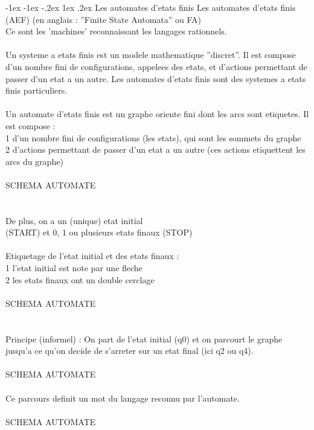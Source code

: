 \documentclass[5pt]{article}
\makeatletter
\renewcommand{\subsubsection}{\@startsection {section}{1}{\z@}%
             {-1ex \@plus -1ex \@minus -.2ex}%
             {1ex \@plus.2ex}%
             {\normalfont\scriptsize\sffamily\bfseries}}
\makeatother
\begin{document}
\begin{scriptsize}
\subsubsection{Les automates d’etats finis}
Les automates d’etats finis (AEF) (en anglais : ”Finite State Automata” ou FA)\\
Ce sont les ’machines’ reconnaissant les langages rationnels.\\
\\
Un systeme a etats finis est un modele mathematique ”discret”. Il est compose d’un nombre fini de configurations, appelees des etats, et d’actions permettant de passer d’un etat a un autre. Les automates d’etats finis sont des systemes a etats finis particuliers.\\
\\
Un automate d’etats finis est un graphe oriente fini dont les arcs sont etiquetes. Il est compose :\\
1 d’un nombre fini de configurations (les etats), qui sont les sommets du graphe\\
2 d’actions permettant de passer d’un etat a un autre (ces actions etiquettent les arcs du graphe)\\
\\
SCHEMA AUTOMATE\\
\\
\\
De plus, on a un (unique) etat initial\\
(START) et 0, 1 ou plusieurs etats finaux (STOP)\\
\\
Etiquetage de l’etat initial et des etats finaux :\\
1 l’etat initial est note par une fleche\\
2 les etats finaux ont un double cerclage\\
\\
SCHEMA AUTOMATE\\
\\
\\
Principe (informel) : On part de l’etat initial (q0) et on parcourt le graphe jusqu’a ce qu’on decide de s’arreter sur un etat final (ici q2 ou q4).\\
\\
SCHEMA AUTOMATE\\
\\
Ce parcours definit un mot du langage reconnu par l’automate.
\\
\\
SCHEMA AUTOMATE\\

\end{scriptsize}
\end{document}
